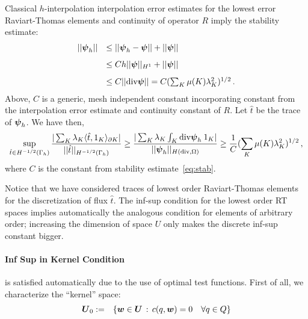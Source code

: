 \documentclass[Proposal.tex]{subfiles}
\begin{document}
Classical $h$-interpolation interpolation error estimates for the lowest error
Raviart-Thomas elements and continuity of operator $R$ imply the stability estimate:
\begin{equation}
\begin{array}{lll}
|| \boldsymbol\psi_h || & \leq || \boldsymbol\psi_h - \boldsymbol\psi || + || \boldsymbol\psi ||\\[8pt]
&\leq C h || \boldsymbol\psi ||_{H^1} +  || \boldsymbol\psi || \\[8pt]
& \leq C || \text{div} \boldsymbol\psi || = C (\sum_K \mu(K) \lambda_K^2)^{1/2}\,.
\end{array}
\label{eq:stab}
\end{equation}
Above, $C$ is a generic, mesh independent constant incorporating constant from
the interpolation error estimate and continuity constant of $R$.
Let $\hat{t}$ be the trace of $\boldsymbol\psi_h$. We have then,
\begin{equation}
\sup_{\hat{t} \in H^{-1/2}(\Gamma_h)} \frac{|  \sum_K \lambda_K \langle
\hat{t},1_K \rangle_{\partial K} |}{|| \hat{t} ||_{H^{-1/2}(\Gamma_h)}}
\geq \frac{| \sum_K \lambda_K \int_K \text{div} \boldsymbol\psi_h \: 1_K  |}
{|| \boldsymbol\psi_h ||_{H(\text{div},\Omega)}}
\geq \frac{1}{C} (\sum_K \mu(K) \lambda_K^2)^{1/2}\,,
\end{equation}
where $C$ is the constant from stability estimate~\eqref{eq:stab}.

Notice that we have considered traces of lowest order Raviart-Thomas elements
for the discretization of flux $\hat{t}$. The inf-sup condition for the lowest
order RT spaces implies automatically the analogous condition for elements of
arbitrary order; increasing the dimension of space $U$ only makes the discrete
inf-sup constant bigger.

\paragraph{Inf Sup in Kernel Condition} is satisfied automatically due to the use of optimal
test functions. First of all, we characterize the ``kernel'' space:
\begin{equation}
\begin{array}{rl}
\boldsymbol U_0  := & \left\{  \boldsymbol w \in \boldsymbol U \, : \, c(q,\boldsymbol w) = 0 \quad \forall q \in Q \right\} \\[8pt]
\end{array}
\end{equation}
\end{document}
